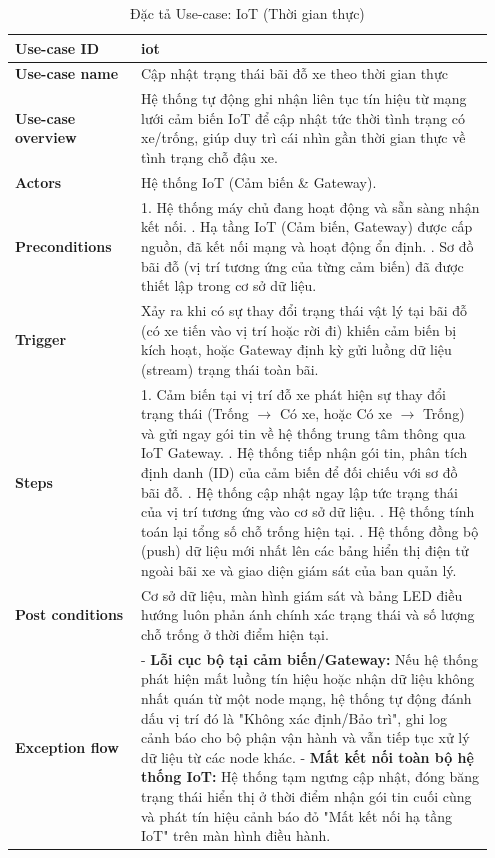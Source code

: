 \documentclass[12pt, a4paper]{article}
\begin{document}
\begin{table}[htpb]
\centering
\renewcommand{\arraystretch}{1.4}
\begin{tabular}{|p{0.25\linewidth}|p{0.7\linewidth}|}
\hline
\textbf{Use-case ID} & iot \\ \hline
\textbf{Use-case name} & Cập nhật trạng thái bãi đỗ xe theo thời gian thực \\ \hline
\textbf{Use-case overview} & Hệ thống tự động ghi nhận liên tục tín hiệu từ mạng lưới cảm biến IoT để cập nhật tức thời tình trạng có xe/trống, giúp duy trì cái nhìn gần thời gian thực về tình trạng chỗ đậu xe. \\ \hline
\textbf{Actors} & Hệ thống IoT (Cảm biến \& Gateway). \\ \hline
\textbf{Preconditions} & 
1. Hệ thống máy chủ đang hoạt động và sẵn sàng nhận kết nối. \newline
2. Hạ tầng IoT (Cảm biến, Gateway) được cấp nguồn, đã kết nối mạng và hoạt động ổn định. \newline
3. Sơ đồ bãi đỗ (vị trí tương ứng của từng cảm biến) đã được thiết lập trong cơ sở dữ liệu. \\ \hline
\textbf{Trigger} & Xảy ra khi có sự thay đổi trạng thái vật lý tại bãi đỗ (có xe tiến vào vị trí hoặc rời đi) khiến cảm biến bị kích hoạt, hoặc Gateway định kỳ gửi luồng dữ liệu (stream) trạng thái toàn bãi. \\ \hline
\textbf{Steps} & 
1. Cảm biến tại vị trí đỗ xe phát hiện sự thay đổi trạng thái (Trống $\rightarrow$ Có xe, hoặc Có xe $\rightarrow$ Trống) và gửi ngay gói tin về hệ thống trung tâm thông qua IoT Gateway. \newline
2. Hệ thống tiếp nhận gói tin, phân tích định danh (ID) của cảm biến để đối chiếu với sơ đồ bãi đỗ. \newline
3. Hệ thống cập nhật ngay lập tức trạng thái của vị trí tương ứng vào cơ sở dữ liệu. \newline
4. Hệ thống tính toán lại tổng số chỗ trống hiện tại. \newline
5. Hệ thống đồng bộ (push) dữ liệu mới nhất lên các bảng hiển thị điện tử ngoài bãi xe và giao diện giám sát của ban quản lý. \\ \hline
\textbf{Post conditions} & Cơ sở dữ liệu, màn hình giám sát và bảng LED điều hướng luôn phản ánh chính xác trạng thái và số lượng chỗ trống ở thời điểm hiện tại.\\ \hline
\textbf{Exception flow} & - \textbf{Lỗi cục bộ tại cảm biến/Gateway:} Nếu hệ thống phát hiện mất luồng tín hiệu hoặc nhận dữ liệu không nhất quán từ một node mạng, hệ thống tự động đánh dấu vị trí đó là "Không xác định/Bảo trì", ghi log cảnh báo cho bộ phận vận hành và vẫn tiếp tục xử lý dữ liệu từ các node khác.\newline
- \textbf{Mất kết nối toàn bộ hệ thống IoT:} Hệ thống tạm ngưng cập nhật, đóng băng trạng thái hiển thị ở thời điểm nhận gói tin cuối cùng và phát tín hiệu cảnh báo đỏ "Mất kết nối hạ tầng IoT" trên màn hình điều hành. \\ \hline
\end{tabular}
\caption{Đặc tả Use-case: IoT (Thời gian thực)}
\label{tab:uc_iot}
\end{table}
\end{document}
